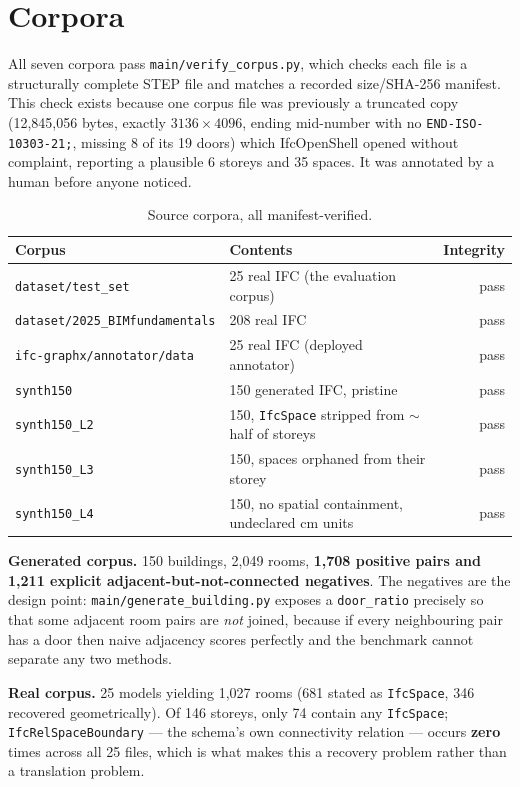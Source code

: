 \documentclass[11pt,a4paper]{article}
\newcommand{\code}[1]{\texttt{\small #1}}
\begin{document}
\section{Corpora}

All seven corpora pass \code{main/verify\_corpus.py}, which checks each file is a
structurally complete STEP file and matches a recorded size/SHA-256 manifest.
This check exists because one corpus file was previously a truncated copy
(12{,}845{,}056 bytes, exactly $3136\times4096$, ending mid-number with no
\code{END-ISO-10303-21;}, missing 8 of its 19 doors) which IfcOpenShell opened
without complaint, reporting a plausible 6 storeys and 35 spaces. It was
annotated by a human before anyone noticed.

\begin{table}[ht]
\centering
\begin{tabular}{llr}
\toprule
Corpus & Contents & Integrity \\
\midrule
\code{dataset/test\_set} & 25 real IFC (the evaluation corpus) & pass \\
\code{dataset/2025\_BIMfundamentals} & 208 real IFC & pass \\
\code{ifc-graphx/annotator/data} & 25 real IFC (deployed annotator) & pass \\
\code{synth150} & 150 generated IFC, pristine & pass \\
\code{synth150\_L2} & 150, \code{IfcSpace} stripped from $\sim$half of storeys & pass \\
\code{synth150\_L3} & 150, spaces orphaned from their storey & pass \\
\code{synth150\_L4} & 150, no spatial containment, undeclared cm units & pass \\
\bottomrule
\end{tabular}
\caption{Source corpora, all manifest-verified.}
\end{table}

\noindent
\textbf{Generated corpus.} 150 buildings, 2{,}049 rooms, \textbf{1{,}708 positive
pairs and 1{,}211 explicit adjacent-but-not-connected negatives}. The negatives
are the design point: \code{main/generate\_building.py} exposes a
\code{door\_ratio} precisely so that some adjacent room pairs are \emph{not}
joined, because if every neighbouring pair has a door then naive adjacency
scores perfectly and the benchmark cannot separate any two methods.

\noindent
\textbf{Real corpus.} 25 models yielding 1{,}027 rooms (681 stated as
\code{IfcSpace}, 346 recovered geometrically). Of 146 storeys, only 74 contain
any \code{IfcSpace}; \code{IfcRelSpaceBoundary} --- the schema's own
connectivity relation --- occurs \textbf{zero} times across all 25 files, which
is what makes this a recovery problem rather than a translation problem.
\end{document}
